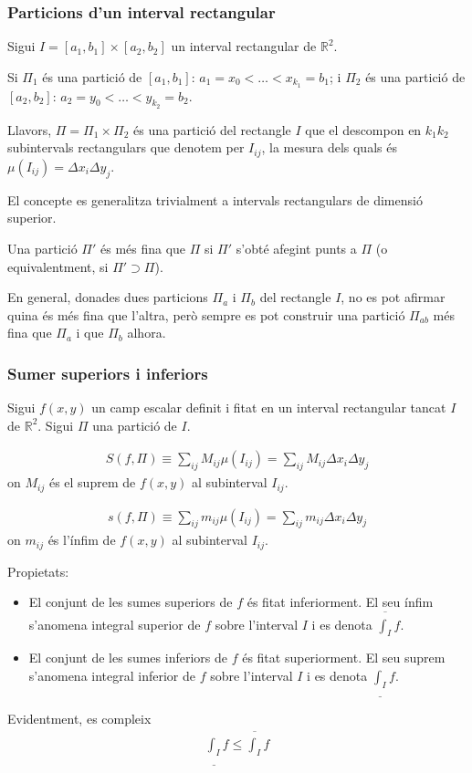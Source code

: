 \subsubsection*{Particions d'un interval rectangular}
\begin{defi}
	Sigui $I = [a_{1}, b_{1}] \times [a_{2}, b_{2}]	$ un interval rectangular de $\mathbb{R}^{2}$.

	Si $\Pi_{1}$ és una partició de $[a_{1}, b_{1}]$: $a_{1} = x_{0} < \dots < x_{k_{1}} = b_{1}$; i $\Pi_{2}$ és una partició de $[a_{2}, b_{2}]$: $a_{2} = y_{0} < \dots < y_{k_{2}} = b_{2}$.

	Llavors, $\Pi = \Pi_{1} \times \Pi_{2}$ és una partició del rectangle $I$ que el descompon en $k_{1}k_{2}$ subintervals rectangulars que denotem per $I_{ij}$, la mesura dels quals és $\mu(I_{ij}) = \Delta x_{i} \Delta y_{j}$.

	El concepte es generalitza trivialment a intervals rectangulars de dimensió superior.
\end{defi}
Una partició $\Pi'$ és més fina que $\Pi$ si $\Pi'$ s'obté afegint punts a $\Pi$ (o equivalentment, si $\Pi' \supset \Pi$).

En general, donades dues particions $\Pi_{a}$ i $\Pi_{b}$ del rectangle $I$, no es pot afirmar quina és més fina que l'altra, però sempre es pot construir una partició $\Pi_{ab}$ més fina que $\Pi_{a}$ i que $\Pi_{b}$ alhora.

\subsubsection*{Sumer superiors i inferiors}
Sigui $f(x,y)$ un camp escalar definit i fitat en un interval rectangular tancat $I$ de $\mathbb{R}^{2}$. Sigui $\Pi$ una partició de $I$.
\begin{defi}
	\begin{align}
		S(f,\Pi) \equiv \sum_{ij} M_{ij} \mu(I_{ij}) = \sum_{ij} M_{ij} \Delta x_{i} \Delta y_{j}
	\end{align}
	on $M_{ij}$ és el suprem de $f(x,y)$ al subinterval $I_{ij}$.
\end{defi}
\begin{defi}
	\begin{align}
		s(f,\Pi) \equiv \sum_{ij} m_{ij} \mu(I_{ij}) = \sum_{ij} m_{ij} \Delta x_{i} \Delta y_{j}
	\end{align}
	on $m_{ij}$ és l'ínfim de $f(x,y)$ al subinterval $I_{ij}$.
\end{defi}
Propietats:
\begin{itemize}
	\item El conjunt de les sumes superiors de $f$ és fitat inferiorment. El seu ínfim s'anomena integral superior de $f$ sobre l'interval $I$ i es denota $\displaystyle \overline{\int_{I}} f$.
	\item El conjunt de les sumes inferiors de $f$ és fitat superiorment. El seu suprem s'anomena integral inferior de $f$ sobre l'interval $I$ i es denota $\displaystyle \underline{\int_{I}} f$.
\end{itemize}
Evidentment, es compleix
\begin{align}
	\underline{\int_{I}} f \leq \overline{\int_{I}} f
\end{align}

